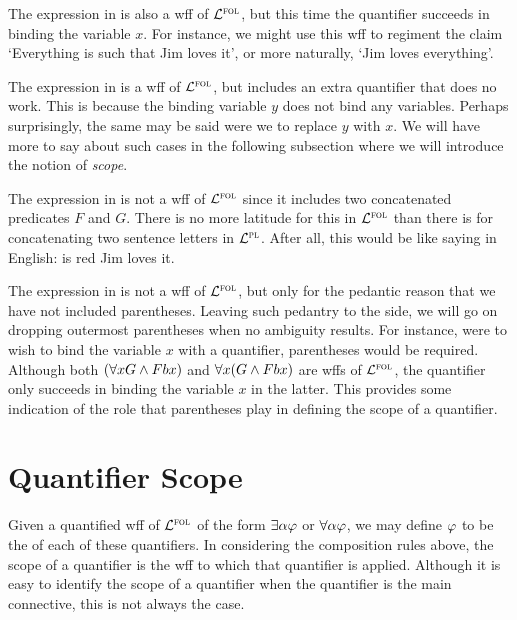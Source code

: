 The expression in  is also a wff of $\mathcal{L}^{\textsc{fol}}$, but this time the quantifier succeeds in binding the variable $x$.
For instance, we might use this wff to regiment the claim `Everything is such that Jim loves it', or more naturally, `Jim loves everything'.

The expression in  is a wff of $\mathcal{L}^{\textsc{fol}}$, but includes an extra quantifier that does no work.
This is because the binding variable $y$ does not bind any variables. 
Perhaps surprisingly, the same may be said were we to replace $y$ with $x$.
We will have more to say about such cases in the following subsection where we will introduce the notion of \textit{scope}.

The expression in  is not a wff of $\mathcal{L}^{\textsc{fol}}$ since it includes two concatenated predicates $F$ and $G$.
There is no more latitude for this in $\mathcal{L}^{\textsc{fol}}$ than there is for concatenating two sentence letters in $\mathcal{L}^{\textsc{pl}}$.
After all, this would be like saying in English: is red Jim loves it. 

The expression in  is not a wff of $\mathcal{L}^{\textsc{fol}}$, but only for the pedantic reason that we have not included parentheses.
Leaving such pedantry to the side, we will go on dropping outermost parentheses when no ambiguity results.
For instance, were to wish to bind the variable $x$ with a quantifier, parentheses would be required.
Although both $(\forall x G \wedge Fbx)$ and $\forall x(G \wedge Fbx)$ are wffs of $\mathcal{L}^{\textsc{fol}}$, the quantifier only succeeds in binding the variable $x$ in the latter.
This provides some indication of the role that parentheses play in defining the scope of a quantifier.






\section{Quantifier Scope}

Given a quantified wff of $\mathcal{L}^{\textsc{fol}}$ of the form $\exists \alpha\varphi$ or $\forall \alpha\varphi$, we may define $\varphi$ to be the  of each of these quantifiers.
In considering the composition rules above, the scope of a quantifier is the wff to which that quantifier is applied.
Although it is easy to identify the scope of a quantifier when the quantifier is the main connective, this is not always the case.

